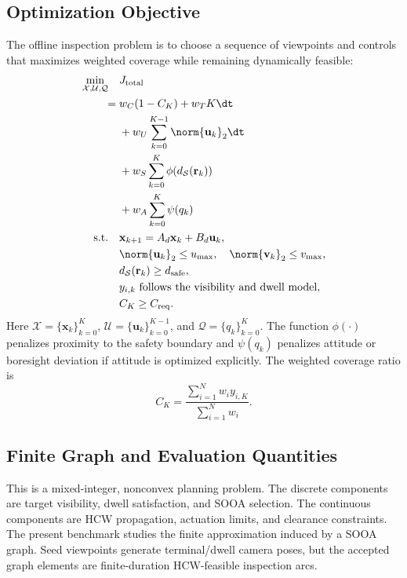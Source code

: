 \subsection{Optimization Objective}

The offline inspection problem is to choose a sequence of viewpoints and
controls that maximizes weighted coverage while remaining dynamically feasible:
\begin{equation}
  \begin{aligned}
  \min_{\mathcal X,\mathcal U,\mathcal Q}\quad & J_{\mathrm{total}} \\
  ={}& w_C (1-C_K) + w_T K\dt \\
  &+ w_U \sum_{k=0}^{K-1}\norm{\mathbf{u}_k}_2\dt \\
  &+ w_S \sum_{k=0}^{K}\phi\!\left(d_{\mathcal S}(\mathbf{r}_k)\right) \\
  &+ w_A \sum_{k=0}^{K}\psi(q_k) \\
  \mathrm{s.t.} \quad
  & \mathbf{x}_{k+1}=A_d\mathbf{x}_k+B_d\mathbf{u}_k, \\
  & \norm{\mathbf{u}_k}_2 \le u_{\max}, \quad \norm{\mathbf{v}_k}_2 \le v_{\max}, \\
  & d_{\mathcal S}(\mathbf{r}_k)\ge d_{\mathrm{safe}}, \\
  & y_{i,k} \text{ follows the visibility and dwell model}, \\
  & C_K \ge C_{\mathrm{req}}.
  \end{aligned}
\end{equation}
Here $\mathcal X=\{\mathbf{x}_k\}_{k=0}^{K}$,
$\mathcal U=\{\mathbf{u}_k\}_{k=0}^{K-1}$,
and $\mathcal Q=\{q_k\}_{k=0}^{K}$. The function $\phi(\cdot)$ penalizes
proximity to the safety boundary and $\psi(q_k)$ penalizes attitude or
boresight deviation if attitude is optimized explicitly.
The weighted coverage ratio is
\begin{equation}
  C_K = \frac{\sum_{i=1}^{N} w_i y_{i,K}}{\sum_{i=1}^{N} w_i}.
\end{equation}

\subsection{Finite Graph and Evaluation Quantities}

This is a mixed-integer, nonconvex planning problem. The discrete components
are target visibility, dwell satisfaction, and SOOA selection. The
continuous components are HCW propagation, actuation limits, and clearance
constraints. The present benchmark studies the finite approximation induced
by a SOOA graph. Seed viewpoints generate terminal/dwell camera poses, but the
accepted graph elements are finite-duration HCW-feasible inspection arcs.

